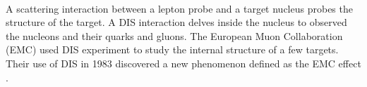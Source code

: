 \paragraph{}A scattering interaction between a lepton probe and a target nucleus probes the structure of the target. A DIS interaction delves inside the nucleus to observed the nucleons and their quarks and gluons. The European Muon Collaboration (EMC) used DIS experiment to study the internal structure of a few targets. Their use of DIS in 1983 discovered a new phenomenon defined as the EMC effect \cite{PnN,CC}.
